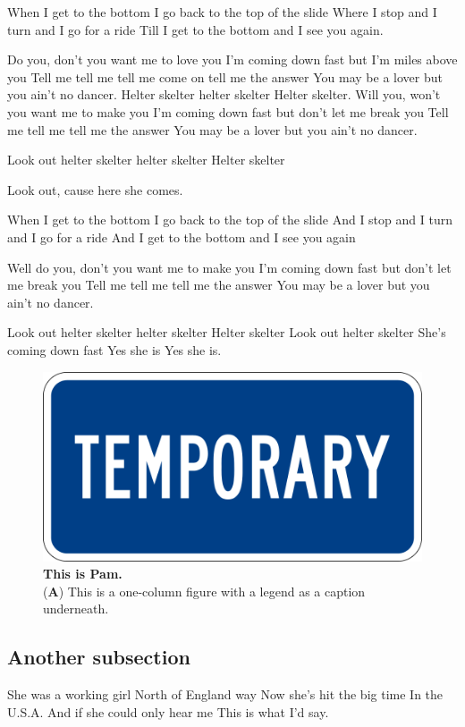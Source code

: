 \documentclass[vruler,JCS]{COB}
\begin{document}
When I get to the bottom I go back to the top of the slide
Where I stop and I turn and I go for a ride
Till I get to the bottom and I see you again.

Do you, don't you want me to love you
I'm coming down fast but I'm miles above you
Tell me tell me tell me come on tell me the answer
You may be a lover but you ain't no dancer.
Helter skelter helter skelter
Helter skelter.
Will you, won't you want me to make you
I'm coming down fast but don't let me break you
Tell me tell me tell me the answer
You may be a lover but you ain't no dancer.

Look out helter skelter helter skelter
Helter skelter 

Look out, cause here she comes.

When I get to the bottom I go back to the top of the slide
And I stop and I turn and I go for a ride
And I get to the bottom and I see you again

Well do you, don't you want me to make you
I'm coming down fast but don't let me break you
Tell me tell me tell me the answer
You may be a lover but you ain't no dancer.

Look out helter skelter helter skelter
Helter skelter
Look out helter skelter
She's coming down fast 
Yes she is 
Yes she is.

\begin{figure}
\centering
\includegraphics[width=0.75\linewidth]{Figures/temp.png}
\caption{\textbf{This is Pam.}\\
(\textbf{A}) This is a one-column figure with a legend as a caption underneath.}
\label{fig:pam}
\end{figure}

\subsection{Another subsection}

She was a working girl
North of England way
Now she's hit the big time
In the U.S.A.
And if she could only hear me
This is what I'd say.
\end{document}
